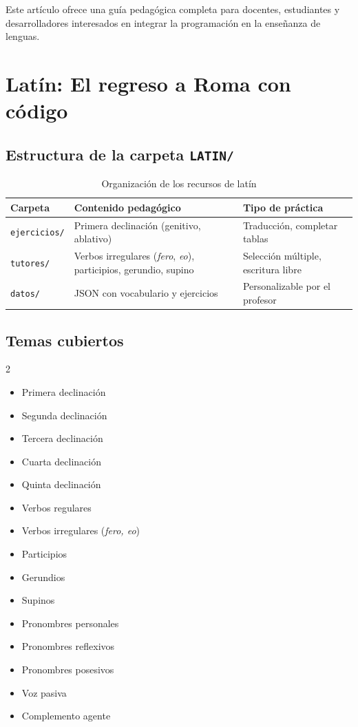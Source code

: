 \documentclass[12pt,spanish]{article}
\begin{document}
Este artículo ofrece una guía pedagógica completa para docentes, estudiantes y desarrolladores interesados en integrar la programación en la enseñanza de lenguas.

\section{Latín: El regreso a Roma con código}

\subsection{Estructura de la carpeta \texttt{LATIN/}}

\begin{table}[H]
\centering
\caption{Organización de los recursos de latín}
\label{tab:latin}
\begin{tabular}{|p{3.5cm}|p{4cm}|p{6cm}|}
\hline
\textbf{Carpeta} & \textbf{Contenido pedagógico} & \textbf{Tipo de práctica} \\
\hline
\texttt{ejercicios/} & Primera declinación (genitivo, ablativo) & Traducción, completar tablas \\
\hline
\texttt{tutores/} & Verbos irregulares (\textit{fero}, \textit{eo}), participios, gerundio, supino & Selección múltiple, escritura libre \\
\hline
\texttt{datos/} & JSON con vocabulario y ejercicios & Personalizable por el profesor \\
\hline
\end{tabular}
\end{table}

\subsection{Temas cubiertos}

\begin{multicols}{2}
\begin{itemize}
    \item Primera declinación
    \item Segunda declinación
    \item Tercera declinación
    \item Cuarta declinación
    \item Quinta declinación
    \item Verbos regulares
    \item Verbos irregulares (\textit{fero, eo})
    \item Participios
    \item Gerundios
    \item Supinos
    \item Pronombres personales
    \item Pronombres reflexivos
    \item Pronombres posesivos
    \item Voz pasiva
    \item Complemento agente
\end{itemize}
\end{multicols}
\end{document}
